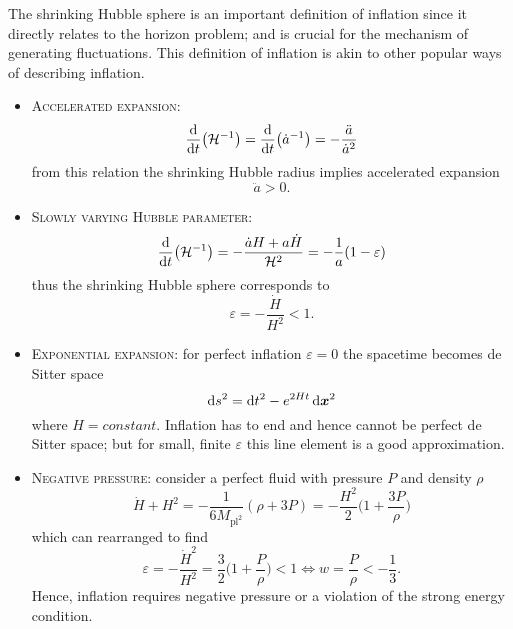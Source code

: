 The shrinking Hubble sphere is an important definition of inflation since it directly relates to the horizon problem; and is crucial for the mechanism of generating fluctuations.
This definition of inflation is akin to other popular ways of describing inflation.
%
\begin{itemize}
	\item \textsc{Accelerated expansion}:
	      \begin{equation}
		      \dv{t} \big(\mathcal{H}^{-1}\big)
		      = \dv{t} \big(\dot{a}^{-1}\big)
		      = -\frac{\ddot{a}}{\dot{a}^{2}}
	      \end{equation}
	      from this relation the shrinking Hubble radius implies accelerated expansion
	      \begin{equation}
		      \ddot{a}
		      > 0.
	      \end{equation}

	\item \textsc{Slowly varying Hubble parameter}:
	      \begin{equation}
		      \dv{t} \big(\mathcal{H}^{-1}\big)
		      = -\frac{\dot{a}H + a\dot{H}}{\mathcal{H}^{2}}
		      = -\frac{1}{a}(1-\varepsilon)
	      \end{equation}
	      thus the shrinking Hubble sphere corresponds to
	      \begin{equation}
		      \varepsilon
		      = -\frac{\dot{H}}{H^{2}}
		      < 1.
	      \end{equation}

	\item \textsc{Exponential expansion}:
	      for perfect inflation \(\varepsilon=0\) the spacetime becomes de Sitter space
	      \begin{equation}
		      \dd{s^{2}}
		      = \dd{t^{2}} - e^{2Ht} \dd{\vb*{x}^{2}}
	      \end{equation}
	      where \(H=constant\).
	      Inflation has to end and hence cannot be perfect de Sitter space; but for small, finite \({\varepsilon}\) this line element is a good approximation.

	\item \textsc{Negative pressure}:
	      consider a perfect fluid with pressure \(P\) and density \({\rho}\)
	      \begin{equation}\label{eq:chapter2_negative_pressure}
		      \dot{H} + H^{2}
		      = -\frac{1}{6M_{\text{pl}^{2}}}(\rho+3P)
		      = -\frac{H^{2}}{2} \bigg(1 + \frac{3P}{\rho}\bigg)
	      \end{equation}
	      which can rearranged to find
	      \begin{equation}
		      \varepsilon
		      = -\frac{\dot{H}^{2}}{H^{2}}
		      = \frac{3}{2} \bigg(1 + \frac{P}{\rho}\bigg) < 1 \Leftrightarrow w = \frac{P}{\rho} < -\frac{1}{3}.
	      \end{equation}
	      Hence, inflation requires negative pressure or a violation of the strong energy condition.


\end{itemize}
